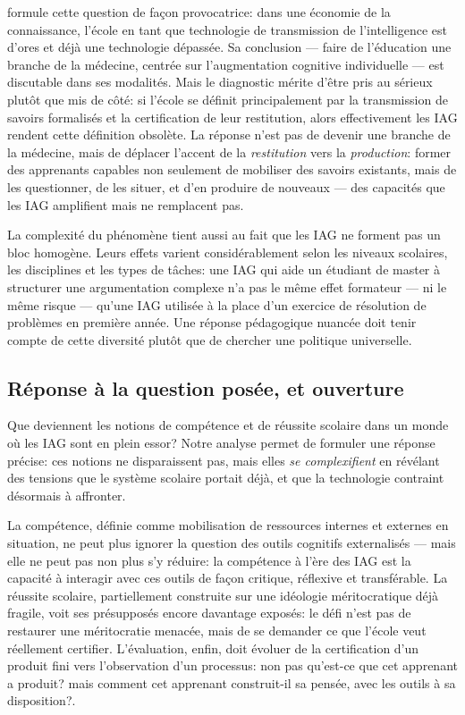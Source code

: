 \cite{alexandre2019ia} formule cette question de façon provocatrice: dans une économie de la connaissance, l'école \og{}en tant que technologie de transmission de l'intelligence est d'ores et déjà une technologie dépassée\fg{}. %
Sa conclusion --- faire de l'éducation une \og{}branche de la médecine\fg{}, centrée sur l'augmentation cognitive individuelle --- est discutable dans ses modalités. 
Mais le diagnostic mérite d'être pris au sérieux plutôt que mis de côté: si l'école se définit principalement par la transmission de savoirs formalisés et la certification de leur restitution, alors effectivement les IAG rendent cette définition obsolète. 
La réponse n'est pas de devenir une branche de la médecine, mais de déplacer l'accent de la \emph{restitution} vers la \emph{production}: former des apprenants capables non seulement de mobiliser des savoirs existants, mais de les questionner, de les situer, et d'en produire de nouveaux --- des capacités que les IAG amplifient mais ne remplacent pas.

La complexité du phénomène tient aussi au fait que les IAG ne forment pas un bloc homogène. 
Leurs effets varient considérablement selon les niveaux scolaires, les disciplines et les types de tâches: une IAG qui aide un étudiant de master à structurer une argumentation complexe n'a pas le même effet formateur --- ni le même risque --- qu'une IAG utilisée à la place d'un exercice de résolution de problèmes en première année. 
Une réponse pédagogique nuancée doit tenir compte de cette diversité plutôt que de chercher une politique universelle.

\subsection*{Réponse à la question posée, et ouverture}

Que deviennent les notions de compétence et de réussite scolaire dans un monde où les IAG sont en plein essor? 
Notre analyse permet de formuler une réponse précise: ces notions ne disparaissent pas, mais elles \emph{se complexifient} en révélant des tensions que le système scolaire portait déjà, et que la technologie contraint désormais à affronter.

La compétence, définie comme mobilisation de ressources internes et externes en situation, ne peut plus ignorer la question des outils cognitifs externalisés --- mais elle ne peut pas non plus s'y réduire: la compétence à l'ère des IAG est la capacité à interagir avec ces outils
de façon critique, réflexive et transférable. 
La réussite scolaire, partiellement construite sur une idéologie méritocratique déjà fragile, voit ses présupposés encore davantage exposés: le défi n'est pas de restaurer une méritocratie menacée, mais de se demander ce que l'école veut réellement certifier. 
L'évaluation, enfin, doit évoluer de la certification d'un produit fini vers l'observation d'un processus: non pas \og{}qu'est-ce que cet apprenant a produit?\fg{} mais \og{}comment cet apprenant construit-il sa pensée, avec les outils à sa disposition?\fg{}.

